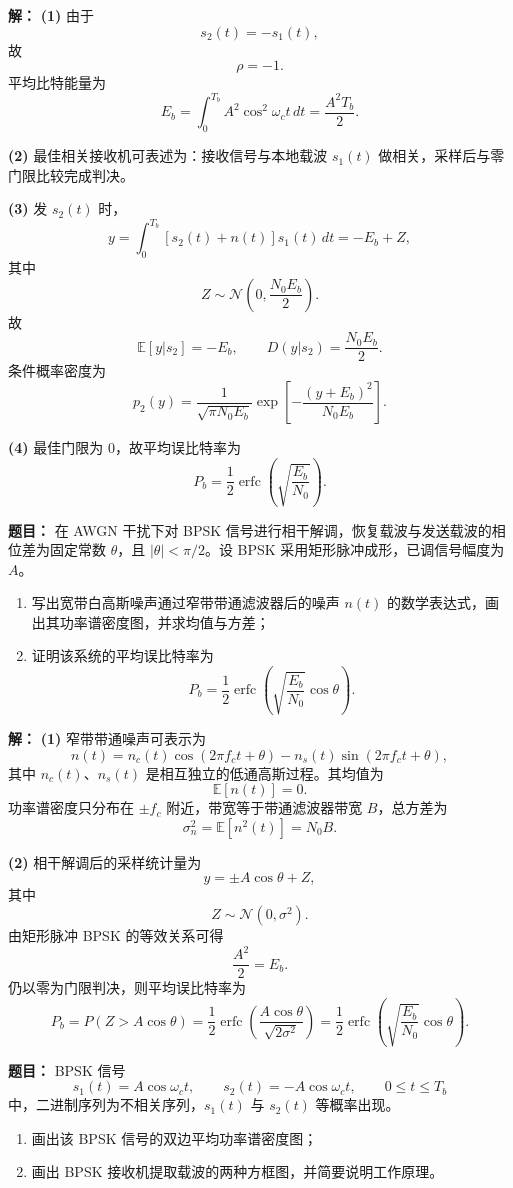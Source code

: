 \par\textbf{解：}
\textbf{(1)} 由于
\[
s_2(t)=-s_1(t),
\]
故
\[
\rho=-1.
\]
平均比特能量为
\[
E_b=\int_0^{T_b}A^2\cos^2\omega_ct\,dt=\frac{A^2T_b}{2}.
\]

\textbf{(2)} 最佳相关接收机可表述为：接收信号与本地载波 $s_1(t)$ 做相关，采样后与零门限比较完成判决。

\textbf{(3)} 发 $s_2(t)$ 时，
\[
y=\int_0^{T_b}[s_2(t)+n(t)]s_1(t)\,dt=-E_b+Z,
\]
其中
\[
Z\sim\mathcal{N}\!\left(0,\frac{N_0E_b}{2}\right).
\]
故
\[
\mathbb{E}[y|s_2]=-E_b,
\qquad
D(y|s_2)=\frac{N_0E_b}{2}.
\]
条件概率密度为
\[
p_2(y)=\frac{1}{\sqrt{\pi N_0E_b}}
\exp\!\left[-\frac{(y+E_b)^2}{N_0E_b}\right].
\]

\textbf{(4)} 最佳门限为 $0$，故平均误比特率为
\[
P_b=\frac12\operatorname{erfc}\!\left(\sqrt{\frac{E_b}{N_0}}\right).
\]

\medskip
{}
\textbf{题目：}
在 AWGN 干扰下对 BPSK 信号进行相干解调，恢复载波与发送载波的相位差为固定常数 $\theta$，且 $|\theta|<\pi/2$。设 BPSK 采用矩形脉冲成形，已调信号幅度为 $A$。
\begin{enumerate}
\item 写出宽带白高斯噪声通过窄带带通滤波器后的噪声 $n(t)$ 的数学表达式，画出其功率谱密度图，并求均值与方差；
\item 证明该系统的平均误比特率为
\[
P_b=\frac12\operatorname{erfc}\!\left(\sqrt{\frac{E_b}{N_0}}\cos\theta\right).
\]
\end{enumerate}

\par\textbf{解：}
\textbf{(1)} 窄带带通噪声可表示为
\[
n(t)=n_c(t)\cos(2\pi f_ct+\theta)-n_s(t)\sin(2\pi f_ct+\theta),
\]
其中 $n_c(t)$、$n_s(t)$ 是相互独立的低通高斯过程。其均值为
\[
\mathbb{E}[n(t)]=0.
\]
功率谱密度只分布在 $\pm f_c$ 附近，带宽等于带通滤波器带宽 $B$，总方差为
\[
\sigma_n^2=\mathbb{E}[n^2(t)]=N_0B.
\]

\textbf{(2)} 相干解调后的采样统计量为
\[
y=\pm A\cos\theta+Z,
\]
其中
\[
Z\sim\mathcal{N}(0,\sigma^2).
\]
由矩形脉冲 BPSK 的等效关系可得
\[
\frac{A^2}{2}=E_b.
\]
仍以零为门限判决，则平均误比特率为
\[
P_b=P(Z>A\cos\theta)
=\frac12\operatorname{erfc}\!\left(\frac{A\cos\theta}{\sqrt{2\sigma^2}}\right)
=\frac12\operatorname{erfc}\!\left(\sqrt{\frac{E_b}{N_0}}\cos\theta\right).
\]

\medskip
{}
\textbf{题目：}
BPSK 信号
\[
s_1(t)=A\cos\omega_ct,\qquad
s_2(t)=-A\cos\omega_ct,\qquad 0\le t\le T_b
\]
中，二进制序列为不相关序列，$s_1(t)$ 与 $s_2(t)$ 等概率出现。
\begin{enumerate}
\item 画出该 BPSK 信号的双边平均功率谱密度图；
\item 画出 BPSK 接收机提取载波的两种方框图，并简要说明工作原理。
\end{enumerate}

